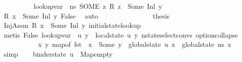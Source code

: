 \begin{isabellebody}
\ \ \ \ \ \ \isamarkupfalse%
\ {\isachardoublequoteopen}{\isasymdots}\ {\isacharequal}{\kern0pt}\ {\isacharparenleft}{\kern0pt}lookup{\isacharunderscore}{\kern0pt}var\ {\isasymLambda}\ ns\ {\isacharparenleft}{\kern0pt}SOME\ z{\isachardot}{\kern0pt}\ R\ z\ {\isacharequal}{\kern0pt}\ Some\ {\isacharparenleft}{\kern0pt}Inl\ y{\isacharparenright}{\kern0pt}{\isacharparenright}{\kern0pt}{\isacharparenright}{\kern0pt}{\isachardoublequoteclose}\ \isamarkupfalse%
\ {\isacartoucheopen}R\ x\ {\isacharequal}{\kern0pt}\ Some\ {\isacharparenleft}{\kern0pt}Inl\ y{\isacharparenright}{\kern0pt}{\isacartoucheclose}\ False\ \isamarkupfalse%
\ auto\ \ \ \ \ \ \isanewline
\ \ \ \ \ \ \isamarkupfalse%
\ \isamarkupfalse%
\ {\isacharquery}{\kern0pt}thesis\ \isamarkupfalse%
\ InjAssm\ {\isacartoucheopen}R\ x\ {\isacharequal}{\kern0pt}\ Some\ {\isacharparenleft}{\kern0pt}Inl\ y{\isacharparenright}{\kern0pt}{\isacartoucheclose}\ initial{\isacharunderscore}{\kern0pt}state{\isacharunderscore}{\kern0pt}lookup\isanewline
\ \ \ \ \ \ \ \ \isamarkupfalse%
\ {\isacharparenleft}{\kern0pt}metis\ False\ {\isacartoucheopen}lookup{\isacharunderscore}{\kern0pt}var\ {\isasymLambda}{\isacharprime}{\kern0pt}\ {\isacharquery}{\kern0pt}u\ y\ {\isacharequal}{\kern0pt}\ local{\isacharunderscore}{\kern0pt}state\ {\isacharquery}{\kern0pt}u\ y{\isacartoucheclose}\ nstate{\isachardot}{\kern0pt}select{\isacharunderscore}{\kern0pt}convs{\isacharparenleft}{\kern0pt}{}{\isacharparenright}{\kern0pt}\ option{\isachardot}{\kern0pt}collapse{\isacharparenright}{\kern0pt}\isanewline
\ \ \ \ \isamarkupfalse%
\isanewline
\ \ \isamarkupfalse%
\isanewline
{}\isamarkupfalse%
\isanewline
\ \ \isamarkupfalse%
\ {\isachardoublequoteopen}{\isasymforall}x\ y{\isachardot}{\kern0pt}\ map{\isacharunderscore}{\kern0pt}of\ {\isacharparenleft}{\kern0pt}fst\ {\isasymLambda}{\isacharparenright}{\kern0pt}\ x\ {\isacharequal}{\kern0pt}\ Some\ y\ {\isasymlongrightarrow}\ {\isacharparenleft}{\kern0pt}global{\isacharunderscore}{\kern0pt}state\ {\isacharquery}{\kern0pt}u{\isacharparenright}{\kern0pt}\ x\ {\isacharequal}{\kern0pt}\ {\isacharparenleft}{\kern0pt}global{\isacharunderscore}{\kern0pt}state\ ns{\isacharparenright}{\kern0pt}\ x{\isachardoublequoteclose}\ \isamarkupfalse%
\ simp\isanewline
{}\isamarkupfalse%
\isanewline
\ \ \isamarkupfalse%
\ {\isachardoublequoteopen}binder{\isacharunderscore}{\kern0pt}state\ {\isacharquery}{\kern0pt}u\ {\isacharequal}{\kern0pt}\ Map{\isachardot}{\kern0pt}empty{\isachardoublequoteclose}\isanewline

\end{isabellebody}
